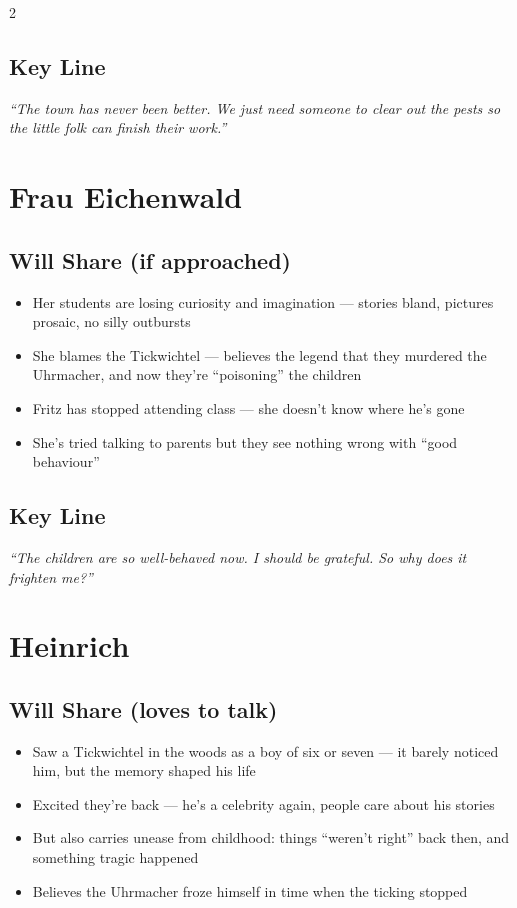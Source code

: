 \documentclass[10pt,letterpaper]{article}
\begin{document}
\begin{multicols}{2}
\subsection*{Key Line}
\textit{``The town has never been better. We just need someone to clear out the pests so the little folk can finish their work.''}

\columnbreak

\section*{Frau Eichenwald}
\subsection*{Will Share (if approached)}
\begin{itemize}
\item Her students are losing curiosity and imagination --- stories bland, pictures prosaic, no silly outbursts
\item She blames the Tickwichtel --- believes the legend that they murdered the Uhrmacher, and now they're ``poisoning'' the children
\item Fritz has stopped attending class --- she doesn't know where he's gone
\item She's tried talking to parents but they see nothing wrong with ``good behaviour''
\end{itemize}
\subsection*{Key Line}
\textit{``The children are so well-behaved now. I should be grateful. So why does it frighten me?''}

\section*{Heinrich}
\subsection*{Will Share (loves to talk)}
\begin{itemize}
\item Saw a Tickwichtel in the woods as a boy of six or seven --- it barely noticed him, but the memory shaped his life
\item Excited they're back --- he's a celebrity again, people care about his stories
\item But also carries unease from childhood: things ``weren't right'' back then, and something tragic happened
\item Believes the Uhrmacher froze himself in time when the ticking stopped
\end{itemize}

\end{multicols}
\end{document}
